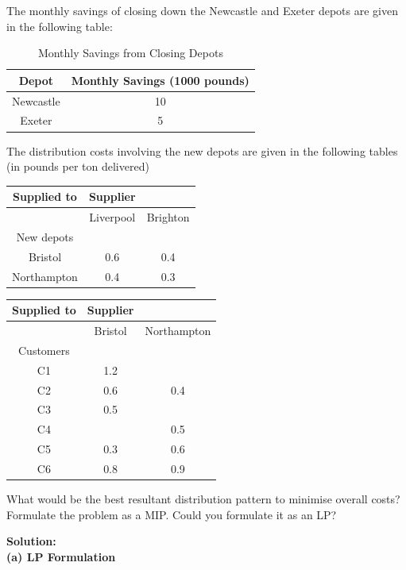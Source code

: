 \documentclass[a4paper,10pt]{article}
\begin{document}
The monthly savings of closing down the Newcastle and Exeter depots are given in the
following table:
\begin{table}[H]
\centering
\begin{tabular}{|c|c|}
\hline
Depot & Monthly Savings (1000 pounds) \\ 
\hline
Newcastle & 10 \\ 
Exeter & 5 \\ 
\hline
\end{tabular}
\caption{Monthly Savings from Closing Depots}
\end{table}

The distribution costs involving the new depots are given in the following tables (in pounds per
ton delivered)

\begin{center}
\begin{tabular}{|c|c|c|}
\hline
Supplied to & Supplier \\
\hline
& Liverpool & Brighton \\
\hline
New depots &&\\
\hline
Bristol & 0.6 & 0.4 \\
Northampton & 0.4 & 0.3 \\
\hline
\end{tabular}
\end{center}

\begin{center}
\begin{tabular}{|c|c|c|}
\hline
Supplied to & Supplier \\
\hline
& Bristol & Northampton \\
\hline
Customers &&\\
\hline
C1 & 1.2 & \\
C2 & 0.6 & 0.4 \\
C3 & 0.5 & \\
C4 & & 0.5 \\
C5 & 0.3 & 0.6 \\
C6 & 0.8 & 0.9 \\
\hline
\end{tabular}
\end{center}

What would be the best resultant distribution pattern to minimise overall costs? Formulate
the problem as a MIP. Could you formulate it as an LP?

\textbf{Solution:}\\

\textbf{(a) LP Formulation}\\
\end{document}
